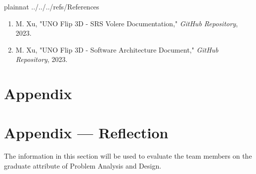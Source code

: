 \documentclass[12pt, titlepage]{article}
\begin{document}
 {plainnat}
 {../../../refs/References}
\begin{enumerate}
    \item M. Xu, "UNO Flip 3D - SRS Volere Documentation," \textit{GitHub Repository}, 2023.
    \item M. Xu, "UNO Flip 3D - Software Architecture Document," \textit{GitHub Repository}, 2023.
\end{enumerate}

\newpage
\section{Appendix} \label{Appendix}





\section*{Appendix --- Reflection}



The information in this section will be used to evaluate the team members on the
graduate attribute of Problem Analysis and Design.
\end{document}
